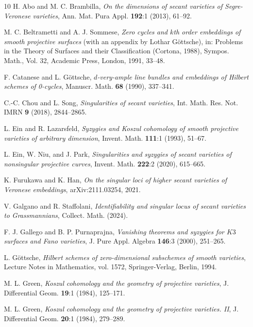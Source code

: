 \documentclass[a4paper]{amsart}
\numberwithin{equation}{section}
\theoremstyle{plain}
\theoremstyle{definition}
\theoremstyle{remark}
\numberwithin{figure}{section}
\numberwithin{table}{section}
\numberwithin{equation}{section}
\begin{document}
\begin{thebibliography}{10}
 H. Abo and M. C. Brambilla, \textit{On the dimensions of secant varieties of Segre-Veronese varieties}, Ann. Mat. Pura Appl. \textbf{192}:1 (2013), 61--92.

 M. C. Beltrametti and A. J. Sommese, \textit{Zero cycles and $k$th order embeddings of smooth projective surfaces} (with an appendix by Lothar Göttsche), in: Problems in the Theory of Surfaces and their Classification (Cortona, 1988), Sympos. Math., Vol. 32, Academic Press, London, 1991, 33--48.

 F. Catanese and L. Göttsche, \textit{$d$-very-ample line bundles and embeddings of Hilbert schemes of 0-cycles}, Manuscr. Math. \textbf{68} (1990), 337--341.

 C.-C. Chou and L. Song, \textit{Singularities of secant varieties}, Int. Math. Res. Not. IMRN \textbf{9} (2018), 2844--2865.

 L. Ein and R. Lazarsfeld, \textit{Syzygies and Koszul cohomology of smooth projective varieties of arbitrary dimension}, Invent. Math. \textbf{111}:1 (1993), 51--67.

 L. Ein, W. Niu, and J. Park, \textit{Singularities and syzygies of secant varieties of nonsingular projective curves}, Invent. Math. \textbf{222}:2 (2020), 615--665.

 K. Furukawa and K. Han, \textit{On the singular loci of higher secant varieties of Veronese embeddings}, arXiv:2111.03254, 2021.

 V. Galgano and R. Staffolani, \textit{Identifiability and singular locus of secant varieties to Grassmannians}, Collect. Math. (2024).

 F. J. Gallego and B. P. Purnaprajna, \textit{Vanishing theorems and syzygies for $K3$ surfaces and Fano varieties}, J. Pure Appl. Algebra \textbf{146}:3 (2000), 251--265.

 L. Göttsche, \textit{Hilbert schemes of zero-dimensional subschemes of smooth varieties}, Lecture Notes in Mathematics, vol. 1572, Springer-Verlag, Berlin, 1994.

 M. L. Green, \textit{Koszul cohomology and the geometry of projective varieties}, J. Differential Geom. \textbf{19}:1 (1984), 125--171.

 M. L. Green, \textit{Koszul cohomology and the geometry of projective varieties. II}, J. Differential Geom. \textbf{20}:1 (1984), 279--289.


\end{thebibliography}
\end{document}
